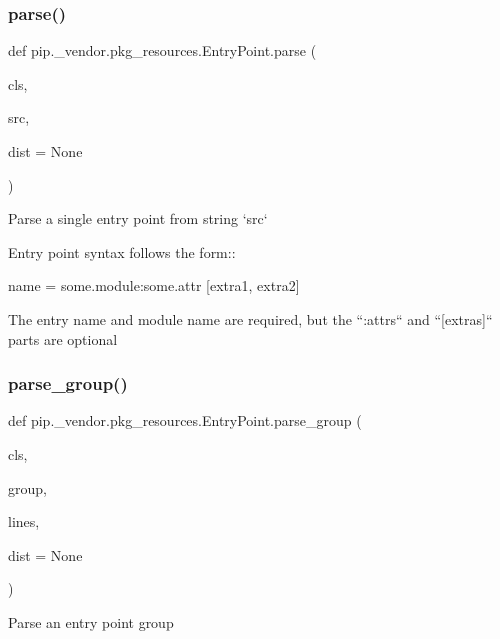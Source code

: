 \subsubsection{\texorpdfstring{parse()}{parse()}}
{\footnotesize\ttfamily def pip.\+\_\+vendor.\+pkg\+\_\+resources.\+Entry\+Point.\+parse (\begin{DoxyParamCaption}\item[{}]{cls,  }\item[{}]{src,  }\item[{}]{dist = {\ttfamily None} }\end{DoxyParamCaption})}

\begin{DoxyVerb}Parse a single entry point from string `src`

Entry point syntax follows the form::

    name = some.module:some.attr [extra1, extra2]

The entry name and module name are required, but the ``:attrs`` and
``[extras]`` parts are optional
\end{DoxyVerb}
 \mbox{\label{classpip_1_1__vendor_1_1pkg__resources_1_1EntryPoint_a7a073b57c2523016366e96901108b1e3}} 
\subsubsection{\texorpdfstring{parse\+\_\+group()}{parse\_group()}}
{\footnotesize\ttfamily def pip.\+\_\+vendor.\+pkg\+\_\+resources.\+Entry\+Point.\+parse\+\_\+group (\begin{DoxyParamCaption}\item[{}]{cls,  }\item[{}]{group,  }\item[{}]{lines,  }\item[{}]{dist = {\ttfamily None} }\end{DoxyParamCaption})}

\begin{DoxyVerb}Parse an entry point group\end{DoxyVerb}
 \mbox{\label{classpip_1_1__vendor_1_1pkg__resources_1_1EntryPoint_a49afd2196172292b203587c86ced6b78}} 
